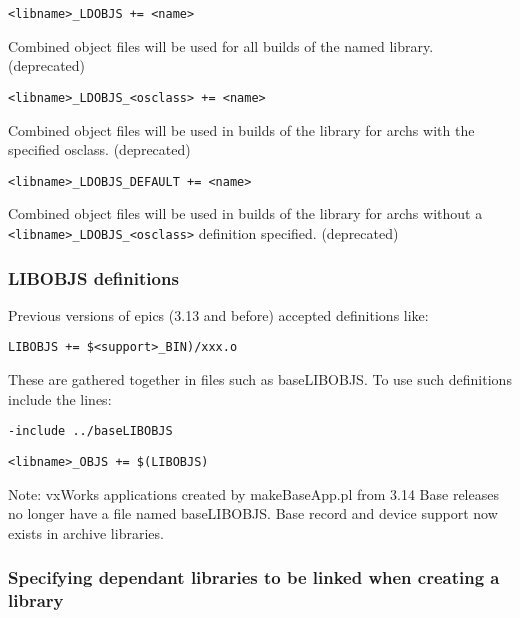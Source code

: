 \begin{description}
\item

\item {}\verb|<libname>_LDOBJS += <name>|

Combined object files will be used for all builds of the named library. (deprecated)

\item \verb|<libname>_LDOBJS_<osclass> += <name>|

Combined object files will be used in builds of the library for archs with the specified osclass. (deprecated)

\item \verb|<libname>_LDOBJS_DEFAULT += <name>|

Combined object files will be used in builds of the library for archs without a \verb|<libname>_LDOBJS_<osclass>|
definition specified. (deprecated)

\end{description}

\subsubsection{LIBOBJS definitions}

Previous versions of epics (3.13 and before) accepted definitions like:

\begin{description}

\item \verb|LIBOBJS += $<support>_BIN)/xxx.o|

These are gathered together in files such as baseLIBOBJS. To use such definitions include the lines:

\item \verb|-include ../baseLIBOBJS|

\item \verb|<libname>_OBJS += $(LIBOBJS)|

Note: vxWorks applications created by makeBaseApp.pl from 3.14 Base releases no longer have a file 
named baseLIBOBJS. Base record and device support now exists in archive libraries.

\end{description}

\subsubsection{Specifying dependant libraries to be linked when creating a library}


